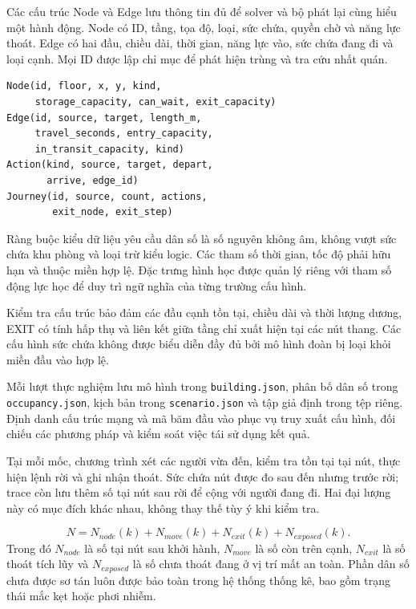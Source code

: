Các cấu trúc Node và Edge lưu thông tin đủ để solver và bộ phát lại cùng hiểu một hành động. Node có ID, tầng, tọa độ, loại, sức chứa, quyền chờ và năng lực thoát. Edge có hai đầu, chiều dài, thời gian, năng lực vào, sức chứa đang đi và loại cạnh. Mọi ID được lập chỉ mục để phát hiện trùng và tra cứu nhất quán.

\begin{lstlisting}
Node(id, floor, x, y, kind,
     storage_capacity, can_wait, exit_capacity)
Edge(id, source, target, length_m,
     travel_seconds, entry_capacity,
     in_transit_capacity, kind)
Action(kind, source, target, depart,
       arrive, edge_id)
Journey(id, source, count, actions,
        exit_node, exit_step)
\end{lstlisting}
Ràng buộc kiểu dữ liệu yêu cầu dân số là số nguyên không âm, không vượt sức chứa khu phòng và loại trừ kiểu logic. Các tham số thời gian, tốc độ phải hữu hạn và thuộc miền hợp lệ. Đặc trưng hình học được quản lý riêng với tham số động lực học để duy trì ngữ nghĩa của từng trường cấu hình.

Kiểm tra cấu trúc bảo đảm các đầu cạnh tồn tại, chiều dài và thời lượng dương, EXIT có tính hấp thụ và liên kết giữa tầng chỉ xuất hiện tại các nút thang. Các cấu hình sức chứa không được biểu diễn đầy đủ bởi mô hình đoàn bị loại khỏi miền đầu vào hợp lệ.

Mỗi lượt thực nghiệm lưu mô hình trong \texttt{building.json}, phân bố dân số trong \texttt{occupancy.json}, kịch bản trong \texttt{scenario.json} và tập giả định trong tệp riêng. Định danh cấu trúc mạng và mã băm đầu vào phục vụ truy xuất cấu hình, đối chiếu các phương pháp và kiểm soát việc tái sử dụng kết quả.

Tại mỗi mốc, chương trình xét các người vừa đến, kiểm tra tồn tại tại nút, thực hiện lệnh rời và ghi nhận thoát. Sức chứa nút được đo sau đến nhưng trước rời; trace còn lưu thêm số tại nút sau rời để cộng với người đang đi. Hai đại lượng này có mục đích khác nhau, không thay thế tùy ý khi kiểm tra.

\begin{equation}N=N_{node}(k)+N_{move}(k)+N_{exit}(k)+N_{exposed}(k).\end{equation}
Trong đó $N_{node}$ là số tại nút sau khởi hành, $N_{move}$ là số còn trên cạnh, $N_{exit}$ là số thoát tích lũy và $N_{exposed}$ là số chưa thoát đang ở vị trí mất an toàn. Phần dân số chưa được sơ tán luôn được bảo toàn trong hệ thống thống kê, bao gồm trạng thái mắc kẹt hoặc phơi nhiễm.

